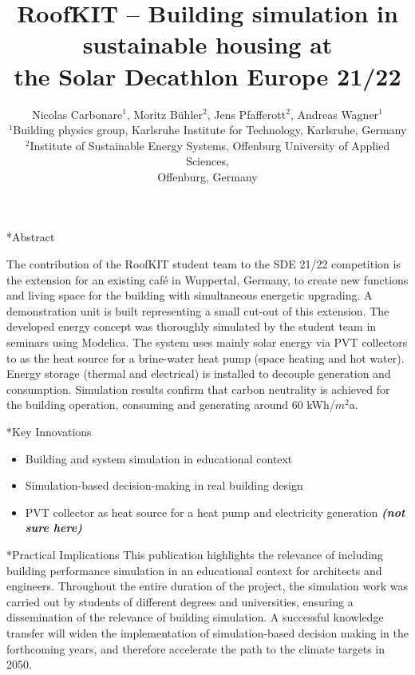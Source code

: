 \documentclass[twocolumn, a4paper,10pt]{article}
\title{%
RoofKIT – Building simulation in sustainable housing at \\%
\vspace{4pt}
the Solar Decathlon Europe 21/22} %
\author{%
Nicolas Carbonare$^1$, Moritz Bühler$^2$, Jens Pfafferott$^2$, Andreas Wagner$^1$\\ %
$^1$Building physics group, Karlsruhe Institute for Technology, Karlsruhe, Germany\\ %
$^2$Institute of Sustainable Energy Systems, Offenburg University of Applied Sciences,\\%
Offenburg, Germany\\ %
\phantom{Line 8} %
\phantom{Line 9}} %
\date{\vspace{-0.5cm}}	%
\makeatletter
\renewcommand\section{\@startsection{section}{1}{\z@}{3pt}{3pt}{\normalfont\large\bfseries}}
\makeatother
\begin{document}
\maketitle
\section*{Abstract}	%
\addtocounter{section}{1}
The contribution of the RoofKIT student team to the SDE 21/22 competition is the extension for an existing café in Wuppertal, Germany, to create new functions and living space for the building with simultaneous energetic upgrading. A demonstration unit is built representing a small cut-out of this extension. The developed energy concept was thoroughly simulated by the student team in seminars using Modelica. The system uses mainly solar energy via PVT collectors to as the heat source for a brine-water heat pump (space heating and hot water). Energy storage (thermal and electrical) is installed to decouple generation and consumption. Simulation results confirm that carbon neutrality is achieved for the building operation, consuming and generating around 60 kWh/$m^2$a.

\section*{Key Innovations}
\begin{itemize}
\item Building and system simulation in educational context
\item Simulation-based decision-making in real building design
\item PVT collector as heat source for a heat pump and electricity generation \textbf{\textit{(not sure here)}}
\end{itemize}

\section*{Practical Implications}
This publication highlights the relevance of including building performance simulation in an educational context for architects and engineers. Throughout the entire duration of the project, the simulation work was carried out by students of different degrees and universities, ensuring a dissemination of the relevance of building simulation. A successful knowledge transfer will widen the implementation of simulation-based decision making in the forthcoming years, and therefore accelerate the path to the climate targets in 2050.  
\end{document}
